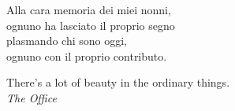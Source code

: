 \cleardoublepage
    \thispagestyle{empty}
		{\large
            \begin{flushright}
				Alla cara memoria dei miei nonni,\\
				ognuno ha lasciato il proprio segno\\
				plasmando chi sono oggi,\\
				ognuno con il proprio contributo.\\
				\vspace{2em}

				There's a lot of beauty in the ordinary things.\\
				\textit{The Office}

            \end{flushright}
		}
\cleardoublepage